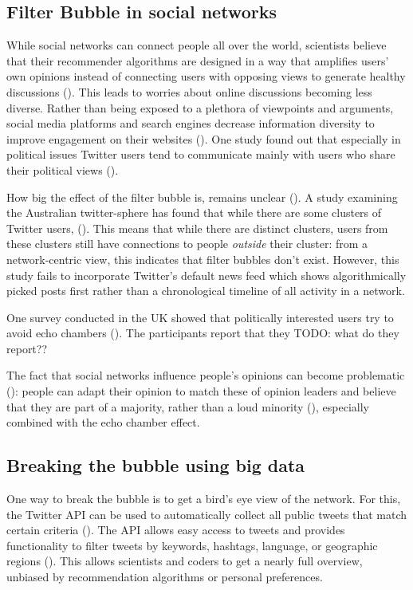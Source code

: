 \subsection{Filter Bubble in social networks}
While social networks can connect people all over the world, scientists believe that their recommender algorithms are designed in a way that amplifies users' own opinions instead of connecting users with opposing views to generate healthy discussions (\cite{pariser2011filter}). This leads to worries about online discussions becoming less diverse. Rather than being exposed to a plethora of viewpoints and arguments, social media platforms and search engines decrease information diversity to improve engagement on their websites (\cite{bozdag2015}). One study found out that especially in political issues Twitter users tend to communicate mainly with users who share their political views (\cite{barbera2015}).


How big the effect of the filter bubble is, remains unclear (\cite{bruns2017}). A study examining the Australian twitter-sphere has found that while there are some clusters of Twitter users,  (\cite[9]{bruns2017}). This means that while there are distinct clusters, users from these clusters still have connections to people \emph{outside} their cluster: from a network-centric view, this indicates that filter bubbles don't exist. However, this study fails to incorporate Twitter's default news feed which shows algorithmically picked posts first rather than a chronological timeline of all activity in a network.

One survey conducted in the UK showed that politically interested users try to avoid echo chambers (\cite{dubois2018}). The participants report that they TODO: what do they report??


The fact that social networks influence people's opinions can become problematic (\cite{altafini2012}): people can adapt their opinion to match these of opinion leaders and believe that they are part of a majority, rather than a loud minority (\cite{moscovici1991}), especially combined with the echo chamber effect. %


\subsection{Breaking the bubble using big data}
One way to break the bubble is to get a bird's eye view of the network. For this, the Twitter API can be used to automatically collect all public tweets that match certain criteria (\cite{twitterinc.a}). The API allows easy access to tweets and provides functionality to filter tweets by keywords, hashtags, language, or geographic regions (\cite{bello2017detecting}). This allows scientists and coders to get a nearly full overview, unbiased by recommendation algorithms or personal preferences.

